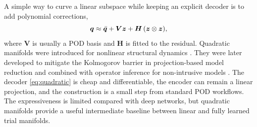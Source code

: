 A simple way to curve a linear subspace while keeping an explicit decoder is
to add polynomial corrections,
\begin{equation}
  \bm{q}\approx\bar{\bm{q}}+\bm{V}\bm{z}+\bm{H}\,(\bm{z}\otimes\bm{z}),
  \label{eq:quadratic}
\end{equation}
where $\bm{V}$ is usually a POD basis and $\bm{H}$ is fitted to the residual.
Quadratic manifolds were introduced for nonlinear structural dynamics
\parencite{jain2017quadratic}. They were later developed to mitigate the
Kolmogorov barrier in projection-based model reduction
\parencite{barnett2022quadratic} and combined with operator inference for
non-intrusive models \parencite{geelen2023quadratic}. The decoder
\eqref{eq:quadratic} is cheap and differentiable, the encoder can remain a
linear projection, and the construction is a small step from standard POD
workflows. The expressiveness is limited compared with deep networks, but
quadratic manifolds provide a useful intermediate baseline between linear and
fully learned trial manifolds.
